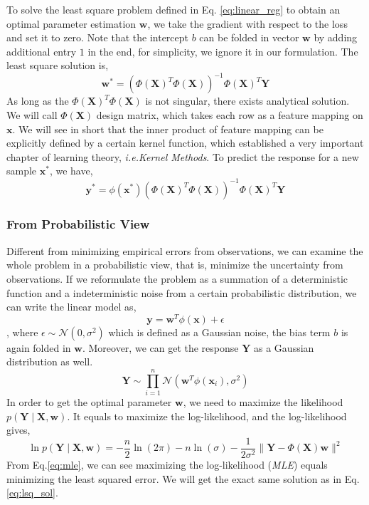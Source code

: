 \documentclass{article}
\newcommand{\ie}{\emph{i.e.}}
\newcommand{\vct}[1]{\ensuremath{\boldsymbol{#1}}} %
\newcommand{\set}[1]{\ensuremath{\mathcal{#1}}}
\begin{document}
To solve the least square problem defined in Eq. \ref{eq:linear_reg} to obtain an optimal parameter estimation $ \vct w $, we take the gradient with respect to the loss and set it to zero. Note that the intercept $ b $ can be folded in vector $ \vct w $ by adding additional entry $1$ in the end, for simplicity, we ignore it in our formulation. The least square solution is,
\begin{equation}
\vct w^* = \left( \Phi(\vct X)^T\Phi(\vct X) \right)^{-1}\Phi(\vct X)^T\vct Y
\label{eq:lsq_sol}
\end{equation}
As long as the $ \Phi(\vct X)^T\Phi(\vct X) $ is not singular, there exists analytical solution. We will call $ \Phi(\vct X) $ design matrix, which takes each row as a feature mapping on $ \vct x $. We will see in short that the inner product of feature mapping can be explicitly defined by a certain kernel function, which established a very important chapter of learning theory, \ie \textit{Kernel Methods}. To predict the response for a new sample $ \vct x^* $, we have,
\[ \vct y^* = \phi(\vct x^*) \left( \Phi(\vct X)^T\Phi(\vct X) \right)^{-1}\Phi(\vct X)^T\vct Y \]

\subsubsection*{From Probabilistic View}
Different from minimizing empirical errors from observations, we can examine the whole problem in a probabilistic view, that is, minimize the uncertainty from observations. If we reformulate the problem as a summation of a deterministic function and a indeterministic noise from a certain probabilistic distribution, we can write the linear model as,
\[ \vct y = \vct w^T \phi(\vct x) + \epsilon \], where $ \epsilon \sim \set N\left( 0, \sigma^2 \right)$ which is defined as a Gaussian noise, the bias term $ b $ is again folded in $ \vct w $. Moreover, we can get the response $ \vct Y $ as a Gaussian distribution as well. 
\[ \vct Y \sim \prod_{i=1}^n \set N\left( \vct w^T\phi(\vct x_i), \sigma^2 \right) \]
In order to get the optimal parameter $ \vct w $, we need to maximize the likelihood $ p\left( \vct Y\mid \vct X, \vct w \right) $. It equals to maximize the log-likelihood, and the log-likelihood gives,
\begin{equation}
\ln p\left( \vct Y \mid \vct X, \vct w \right) = -\frac{n}{2}\ln(2\pi)-n\ln(\sigma) - \frac{1}{2\sigma^2}\|\vct Y - \Phi(\vct X)\vct w\|^2
\label{eq:mle}
\end{equation}
From Eq.\ref{eq:mle}, we can see maximizing the log-likelihood (\textit{MLE}) equals minimizing the least squared error. We will get the exact same solution as in Eq.\ref{eq:lsq_sol}. 
\end{document}

